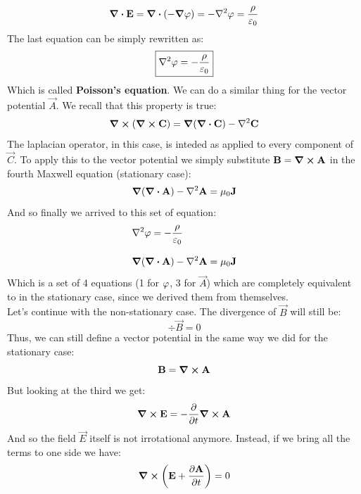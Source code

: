 \begin{equation}
  \div{\vec{E}} = \div{\brackets{-\grad{\potE}}} = -\lap{\potE} = \dfrac{\rho}{\epsz}
\end{equation}
The last equation can be simply rewritten as:
\begin{equation} \label{e:Poisson_eq}
  \boxed{\lap{\potE} = -\dfrac{\rho}{\epsz}}
\end{equation}
Which is called \textbf{Poisson's equation}. We can do a similar thing for the vector potential $\vec{A}$. We recall that this property is true:
\begin{equation}
  \curl{(\curl{\vec{C}})} = \grad{(\div{\vec{C}})} - \lap{\vec{C}}
\end{equation}
The laplacian operator, in this case, is inteded as applied to every component of $\vec{C}$. To apply this to the vector potential we simply substitute $\vb{B} = \curl{\vb{A}}$ in the fourth Maxwell equation (stationary case):
\begin{equation}
  \grad{(\div{\vec{A}})} - \lap{\vec{A}} = \muz \vec{J}
\end{equation}
And so finally we arrived to this set of equation:
\begin{equation} \label{e:pot_stat_eq}
  \begin{split}
    &\lap{\potE} = -\dfrac{\rho}{\epsz}\\[8pt]
    &\grad{(\div{\vec{A}})} - \lap{\vec{A}} = \muz \vec{J}
  \end{split}
\end{equation}
Which is a set of 4 equations (1 for $\varphi$, 3 for $\vec{A}$) which are completely equivalent to \maxwellref\;in the stationary case, since we derived them from \maxwellref\;themselves.\\
Let's continue with the non-stationary case. The divergence of $\vec{B}$ will still be:
\begin{equation}
  \div{\vec{B}} = 0
\end{equation}
Thus, we can still define a vector potential in the same way we did for the stationary case:
\begin{equation}
  \vb{B} = \curl{\vb{A}}
\end{equation}
But looking at the third \maxwellref\;we get:
\begin{equation}
  \curl{\vec{E}} = -\pdv{}{t}\curl{\vec{A}}
\end{equation}
And so the field $\vec{E}$ itself is not irrotational anymore. Instead, if we bring all the terms to one side we have:
\begin{equation}
  \curl{\brackets{\vec{E} + \pdv{\vec{A}}{t}}} = 0
\end{equation}
